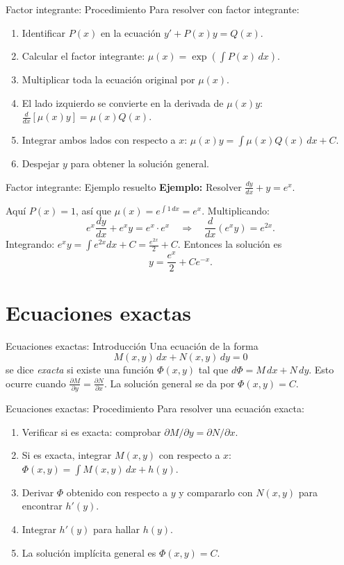 \documentclass{beamer}
\begin{document}
\begin{frame}{Factor integrante: Procedimiento}
Para resolver con factor integrante:
\begin{enumerate}
  \item Identificar $P(x)$ en la ecuación $y' + P(x)y = Q(x)$.
  \item Calcular el factor integrante: $\mu(x) = \exp\left(\int P(x)\,dx\right)$.
  \item Multiplicar toda la ecuación original por $\mu(x)$.
  \item El lado izquierdo se convierte en la derivada de $\mu(x)y$: $\frac{d}{dx}[\mu(x)y] = \mu(x)Q(x)$.
  \item Integrar ambos lados con respecto a $x$: $\mu(x)y = \int \mu(x)Q(x)\,dx + C$.
  \item Despejar $y$ para obtener la solución general.
\end{enumerate}
\end{frame}

\begin{frame}{Factor integrante: Ejemplo resuelto}
\textbf{Ejemplo:} Resolver $\displaystyle\frac{dy}{dx} + y = e^x$.

Aquí $P(x)=1$, así que $\mu(x) = e^{\int 1\,dx} = e^x$. Multiplicando:
\[
e^x \frac{dy}{dx} + e^x y = e^x \cdot e^x \quad\Longrightarrow\quad \frac{d}{dx}(e^x y) = e^{2x}.
\]
Integrando: $e^x y = \int e^{2x} dx + C = \frac{e^{2x}}{2} + C$. Entonces la solución es
\[
y = \frac{e^x}{2} + Ce^{-x}.
\]
\end{frame}

\section*{Ecuaciones exactas}
\begin{frame}{Ecuaciones exactas: Introducción}
Una ecuación de la forma
\[
M(x,y)\,dx + N(x,y)\,dy = 0
\]
se dice \emph{exacta} si existe una función $\Phi(x,y)$ tal que $d\Phi = M\,dx + N\,dy$. Esto ocurre cuando $\frac{\partial M}{\partial y} = \frac{\partial N}{\partial x}$. La solución general se da por $\Phi(x,y) = C$.
\end{frame}

\begin{frame}{Ecuaciones exactas: Procedimiento}
Para resolver una ecuación exacta:
\begin{enumerate}
  \item Verificar si es exacta: comprobar $\partial M/\partial y = \partial N/\partial x$.
  \item Si es exacta, integrar $M(x,y)$ con respecto a $x$: $\Phi(x,y) = \int M(x,y)\,dx + h(y)$.
  \item Derivar $\Phi$ obtenido con respecto a $y$ y compararlo con $N(x,y)$ para encontrar $h'(y)$.
  \item Integrar $h'(y)$ para hallar $h(y)$.
  \item La solución implícita general es $\Phi(x,y) = C$.
\end{enumerate}
\end{frame}
\end{document}
